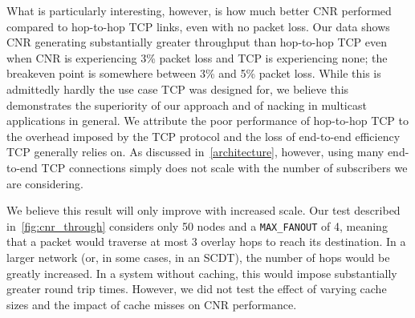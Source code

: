 What is particularly interesting, however, is how much better CNR performed compared to hop-to-hop TCP links, even with no packet loss. Our data shows CNR generating substantially greater throughput than hop-to-hop TCP even when CNR is experiencing 3\% packet loss and TCP is experiencing none; the breakeven point is somewhere between 3\% and 5\% packet loss. While this is admittedly hardly the use case TCP was designed for, we believe this demonstrates the superiority of our approach and of nacking in multicast applications in general. We attribute the poor performance of hop-to-hop TCP to the overhead imposed by the TCP protocol and the loss of end-to-end efficiency \cite{end-to-end-args} TCP generally relies on. As discussed in~\autoref{architecture}, however, using many end-to-end TCP connections simply does not scale with the number of subscribers we are considering.

We believe this result will only improve with increased scale. Our test described  in~\autoref{fig:cnr_through} considers only 50 nodes and a \texttt{MAX\_FANOUT} of 4, meaning that a packet would traverse at most 3 overlay hops to reach its destination. In a larger network (or, in some cases, in an SCDT), the number of hops would be greatly increased. In a system without caching, this would impose substantially greater round trip times. However, we did not test the effect of varying cache sizes and the impact of cache misses on CNR performance.
